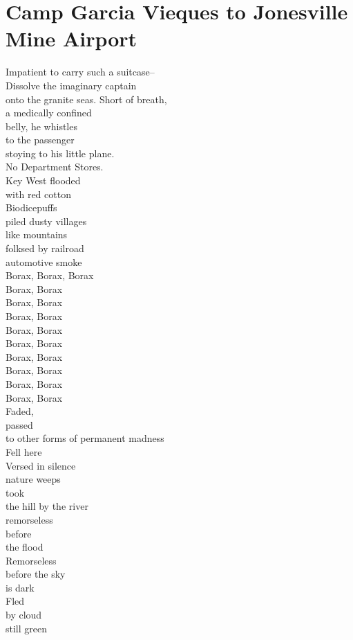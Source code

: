 \documentclass[smalldemyvopaper,11pt,twoside,onecolumn,openright,extrafontsizes]{memoir}
\begin{document}
\chapter{Camp Garcia Vieques to Jonesville Mine Airport}
Impatient to carry such a suitcase--
\\Dissolve the imaginary captain
\\onto the granite seas. Short of breath,
\\a medically confined
\\belly, he whistles
\\to the passenger
\\stoying to his little plane.
\\No Department Stores.
\\Key West flooded
\\with red cotton
\\Biodicepuffs
\\piled dusty villages
\\like mountains
\\folksed by railroad
\\automotive smoke
\\Borax, Borax, Borax
\\Borax, Borax
\\Borax, Borax
\\Borax, Borax
\\Borax, Borax
\\Borax, Borax
\\Borax, Borax
\\Borax, Borax
\\Borax, Borax
\\Borax, Borax
\\Faded,
\\passed
\\to other forms of permanent madness
\\Fell here
\\Versed in silence
\\nature weeps
\\took
\\the hill by the river
\\remorseless
\\before
\\the flood
\\Remorseless
\\before the sky
\\is dark
\\Fled
\\by cloud
\\still green
\end{document}
